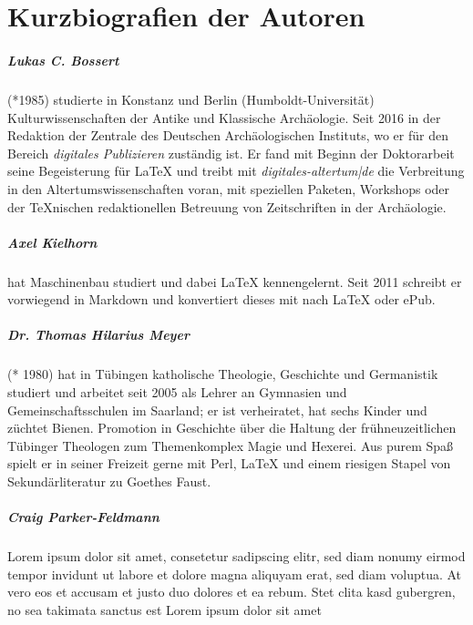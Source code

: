 
\chapter{Kurzbiografien der Autoren}

\paragraph{Lukas C. Bossert} (*1985) studierte in Konstanz und Berlin (Humboldt-Universität) Kulturwissenschaften der Antike und Klassische Archäologie. Seit 2016 in der Redaktion der Zentrale des Deutschen Archäologischen Instituts, wo er für den Bereich \emph{digitales Publizieren} zuständig ist.
Er fand mit Beginn der Doktorarbeit seine Begeisterung für \LaTeX{} und treibt mit \emph{digitales-altertum|de} die Verbreitung in den  Altertumswissenschaften voran, mit speziellen Paketen, Workshops oder der \TeX nischen redaktionellen Betreuung von Zeitschriften in der Archäologie.

\paragraph{Axel Kielhorn} hat Maschinenbau studiert und dabei \LaTeX{} kennengelernt.
Seit 2011 schreibt er vorwiegend in Markdown und konvertiert dieses mit  nach \LaTeX{} oder ePub.

\paragraph{Dr. Thomas Hilarius Meyer} (* 1980) hat in Tübingen katholische Theologie, Geschichte und Germanistik studiert und arbeitet seit 2005 als Lehrer an Gymnasien und Gemeinschaftsschulen im Saarland; er ist verheiratet, hat sechs Kinder und züchtet Bienen.
Promotion in Geschichte über die Haltung der frühneuzeitlichen Tübinger Theologen zum Themenkomplex Magie und Hexerei.
Aus purem Spaß spielt er in seiner Freizeit gerne mit Perl, \LaTeX{} und einem riesigen Stapel von Sekundärliteratur zu Goethes Faust.

\paragraph{Craig Parker-Feldmann} Lorem ipsum dolor sit amet, consetetur sadipscing elitr, sed diam nonumy eirmod tempor invidunt ut labore et dolore magna aliquyam erat, sed diam voluptua. At vero eos et accusam et justo duo dolores et ea rebum. Stet clita kasd gubergren, no sea takimata sanctus est Lorem ipsum dolor sit amet

